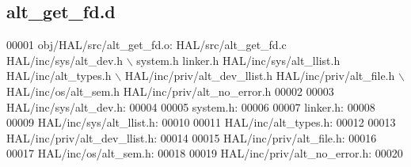 \subsection{alt\+\_\+get\+\_\+fd.\+d}
\label{alt__get__fd_8d_source}

\begin{DoxyCode}
00001 obj/HAL/src/alt_get_fd.o: HAL/src/alt_get_fd.c HAL/inc/sys/alt_dev.h \(\backslash\)
 system.h linker.h HAL/inc/sys/alt_llist.h HAL/inc/alt\_types.h \(\backslash\)
 HAL/inc/priv/alt_dev_llist.h HAL/inc/priv/alt\_file.h \(\backslash\)
 HAL/inc/os/alt\_sem.h HAL/inc/priv/alt_no_error.h
00002 
00003 HAL/inc/sys/alt_dev.h:
00004 
00005 system.h:
00006 
00007 linker.h:
00008 
00009 HAL/inc/sys/alt_llist.h:
00010 
00011 HAL/inc/alt\_types.h:
00012 
00013 HAL/inc/priv/alt_dev_llist.h:
00014 
00015 HAL/inc/priv/alt\_file.h:
00016 
00017 HAL/inc/os/alt\_sem.h:
00018 
00019 HAL/inc/priv/alt_no_error.h:
00020 \end{DoxyCode}
